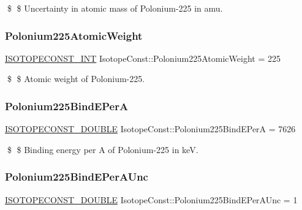 \$ \$ Uncertainty in atomic mass of Polonium-\/225 in amu. \mbox{\label{group___isotope_const-_polonium-_po225_ga29b6969d532666018200f16264872975}} 
\subsubsection{\texorpdfstring{Polonium225\+Atomic\+Weight}{Polonium225AtomicWeight}}
{\footnotesize\ttfamily \mbox{\hyperlink{group___isotope_const-_macros_ga5f18360b3e99483a35c32d789e62621c}{I\+S\+O\+T\+O\+P\+E\+C\+O\+N\+S\+T\+\_\+\+I\+NT}} Isotope\+Const\+::\+Polonium225\+Atomic\+Weight = 225}

\$ \$ Atomic weight of Polonium-\/225. \mbox{\label{group___isotope_const-_polonium-_po225_gaba5a58122d5582736ff6377154a9250e}} 
\subsubsection{\texorpdfstring{Polonium225\+Bind\+E\+PerA}{Polonium225BindEPerA}}
{\footnotesize\ttfamily \mbox{\hyperlink{group___isotope_const-_macros_ga8f45a7272ce02c0b4c65c44636ed719a}{I\+S\+O\+T\+O\+P\+E\+C\+O\+N\+S\+T\+\_\+\+D\+O\+U\+B\+LE}} Isotope\+Const\+::\+Polonium225\+Bind\+E\+PerA = 7626}

\$ \$ Binding energy per A of Polonium-\/225 in keV. \mbox{\label{group___isotope_const-_polonium-_po225_gad6200ab17ef820fa613fc9658c6e9d82}} 
\subsubsection{\texorpdfstring{Polonium225\+Bind\+E\+Per\+A\+Unc}{Polonium225BindEPerAUnc}}
{\footnotesize\ttfamily \mbox{\hyperlink{group___isotope_const-_macros_ga8f45a7272ce02c0b4c65c44636ed719a}{I\+S\+O\+T\+O\+P\+E\+C\+O\+N\+S\+T\+\_\+\+D\+O\+U\+B\+LE}} Isotope\+Const\+::\+Polonium225\+Bind\+E\+Per\+A\+Unc = 1}

